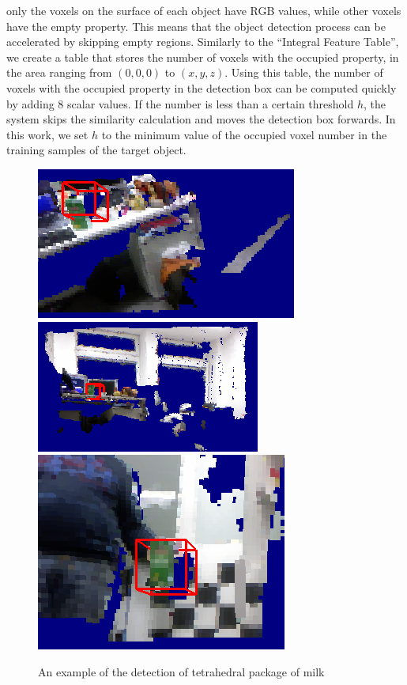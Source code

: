 \documentclass[conference]{sty/IEEEtran}
\begin{document}
   only the voxels on the surface of each object have RGB values, while other voxels have the empty property.
This means that the object detection process can be accelerated by skipping empty regions.
Similarly to the ``Integral Feature Table'', we create a table that stores
   the number of voxels with the occupied property, in the area ranging from $(0,0,0)$ to $(x,y,z)$.
Using this table, the number of voxels with the occupied property in the detection box can be computed quickly by adding 8 scalar values.
If the number is less than a certain threshold $h$,
   the system skips the similarity calculation and moves the detection box forwards.
In this work, we set $h$ to the minimum value of the occupied voxel number in the training samples of the target object.



\begin{figure}[htb!]
  \begin{center}
    \includegraphics[width=.45\columnwidth]{figures/colorCHLAC/detection7.png}
\hfill
    \includegraphics[width=.45\columnwidth]{figures/colorCHLAC/detection5.png} \\
\hfill
    \includegraphics[width=.9\columnwidth]{figures/colorCHLAC/detection2.png}
\caption{An example of the detection of tetrahedral package of milk}
    \label{fig:milk_testing}
  \end{center}
\end{figure}
\end{document}
